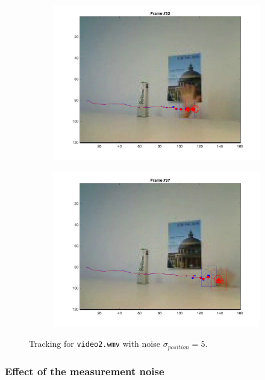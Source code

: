 \documentclass{ethz_report}
\begin{document}
\begin{figure}[h]
\begin{subfigure}[b]{.25\textwidth}
        \includegraphics[width=1\linewidth]{images/video2_noise_low_31}
    \end{subfigure}%
    \begin{subfigure}[b]{.25\textwidth}
        \centering
        \includegraphics[width=1\linewidth]{images/video2_noise_low_36}
    \end{subfigure}
    \caption{Tracking for \texttt{video2.wmv} with noise $\sigma_{position} = 5$.}
    \label{fig:tracking_video2_noise_low}
\end{figure}

\subsubsection*{Effect of the measurement noise}
\end{document}
